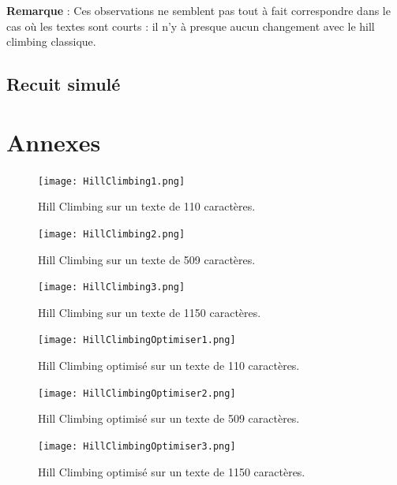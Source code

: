 \documentclass[a4paper]{article}
\begin{document}
\textbf{Remarque} : Ces observations ne semblent pas tout à fait correspondre dans le cas où les textes sont courts : il n'y à presque aucun changement avec le hill climbing classique.


\subsection{Recuit simulé}

\clearpage
\appendix
\section*{Annexes}
\label{sec:annexes}

\begin{figure}[H]
    \centering
    \texttt{[image: HillClimbing1.png]}
    \caption{Hill Climbing sur un texte de 110 caractères.}
    \label{fig:hill_110}
\end{figure}

\begin{figure}[H]
    \centering
    \texttt{[image: HillClimbing2.png]}
    \caption{Hill Climbing sur un texte de 509 caractères.}
    \label{fig:hill_509}
\end{figure}

\begin{figure}[H]
    \centering
    \texttt{[image: HillClimbing3.png]}
    \caption{Hill Climbing sur un texte de 1150 caractères.}
    \label{fig:hill_1150}
\end{figure}
\begin{figure}[H]
    \centering
    \texttt{[image: HillClimbingOptimiser1.png]}
    \caption{Hill Climbing optimisé sur un texte de 110 caractères.}
    \label{fig:hillopt_110}
\end{figure}

\begin{figure}[H]
    \centering
    \texttt{[image: HillClimbingOptimiser2.png]}
    \caption{Hill Climbing optimisé sur un texte de 509 caractères.}
    \label{fig:hillopt_509}
\end{figure}

\begin{figure}[H]
    \centering
    \texttt{[image: HillClimbingOptimiser3.png]}
    \caption{Hill Climbing optimisé sur un texte de 1150 caractères.}
    \label{fig:hillopt_1150}
\end{figure}
\end{document}
